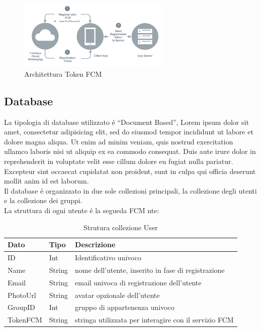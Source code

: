 \begin{figure}[!hb]
  \centering
  \includegraphics[width=0.65\textwidth]{immagini/fcm_token.png}
  \caption{Architettura Token FCM} \label{fig:Architettura Token FCM}
\end{figure}

\subsection{Database}
La tipologia di database utilizzato \'e ``Document Based'', Lorem ipsum dolor sit amet, consectetur adipisicing elit, sed do eiusmod tempor incididunt ut labore et dolore magna aliqua. Ut enim ad minim veniam, quis nostrud exercitation ullamco laboris nisi ut aliquip ex ea commodo consequat. Duis aute irure dolor in reprehenderit in voluptate velit esse cillum dolore eu fugiat nulla pariatur. Excepteur sint occaecat cupidatat non proident, sunt in culpa qui officia deserunt mollit anim id est laborum.\\
Il database \'e organizzato in due sole collezioni principali, la collezione degli utenti e la collezione dei gruppi.\\
La struttura di ogni utente \'e la segueda FCM nte:

\begin{table}[h]
\begin{center}
\begin{tabular}{|p{2cm}|p{2cm}|p{9cm}|}
    \hline
\textbf{Dato} & \textbf{Tipo}  & \textbf{Descrizione}\\ \hline
ID & Int & Identificativo univoco \\\hline
Name & String & nome dell'utente, inserito in fase di registrazione \\ \hline
Email & String &  email univoca di registrazione dell'utente \\ \hline
PhotoUrl & String & avatar opzionale dell'utente \\ \hline
GroupID & Int &  gruppo di appartenenza univoco \\ \hline
TokenFCM & String & stringa utilizzata per interagire con il servizio FCM \\
\hline
\end{tabular}
\caption[Dati Firestore]{Strutura collezione User}\label{tab:Strutture collezzione User}
\end{center}
\end{table}

